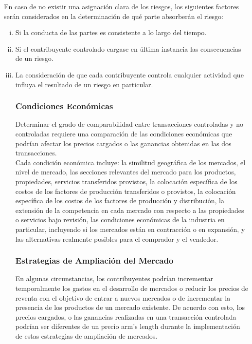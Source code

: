 \begin{enumerate}[1.]
En caso de no existir una asignación clara de los riesgos, los siguientes factores serán considerados en la determinación de qué parte absorberán el riesgo:\\

\begin{enumerate}[i.]

\item 	Si la conducta de las partes es consistente a lo largo del tiempo.
\item Si el contribuyente controlado cargase en última instancia las consecuencias de un riesgo.
\item La consideración de que cada contribuyente controla cualquier actividad que influya el resultado de un riesgo en particular.\\

\subsubsection*{Condiciones Económicas}

Determinar el grado de comparabilidad entre transacciones controladas y no controladas requiere una comparación de las condiciones económicas que podrían afectar los precios cargados o las ganancias obtenidas en las dos transacciones. \\

Cada condición económica incluye: la similitud geográfica de los mercados, el nivel de mercado, las secciones relevantes del mercado para los productos, propiedades, servicios transferidos provistos, la colocación específica de los costos de los factores de producción transferidos o provistos, la colocación específica de los costos de los factores de producción y distribución, la extensión de la competencia en cada mercado con respecto a las propiedades o servicios bajo revisión, las condiciones económicas de la industria en particular, incluyendo si los mercados están en contracción o en expansión, y las alternativas realmente posibles para el comprador y el vendedor.\\

\subsubsection*{Estrategias de Ampliación del Mercado}

En algunas circunstancias, los contribuyentes podrían incrementar temporalmente los gastos en el desarrollo de mercados o reducir los precios de reventa con el objetivo de entrar a nuevos mercados o de incrementar la presencia de los productos de un mercado existente. De acuerdo con esto, los precios cargados, o las ganancias realizadas en una transacción controlada podrían ser diferentes de un precio arm’s length durante la implementación de estas estrategias de ampliación de mercados.\\


\end{enumerate}
\end{enumerate}
